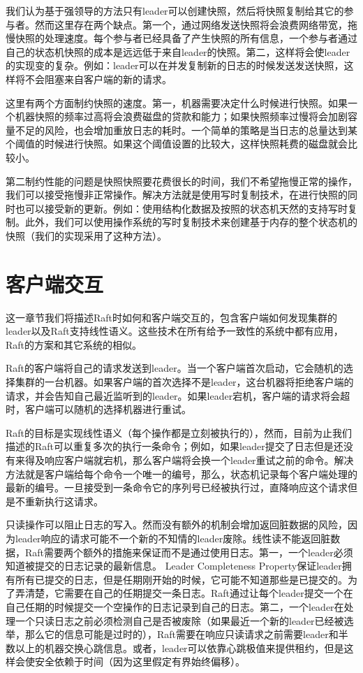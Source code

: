 \documentclass[journal]{IEEEtran}
\begin{document}
我们认为基于强领导的方法只有leader可以创建快照，然后将快照复制给其它的参与者。然而这里存在两个缺点。第一个，通过网络发送快照将会浪费网络带宽，拖慢快照的处理速度。每个参与者已经具备了产生快照的所有信息，一个参与者通过自己的状态机快照的成本是远远低于来自leader的快照。第二，这样将会使leader的实现变的复杂。例如：leader可以在并发复制新的日志的时候发送发送快照，这样将不会阻塞来自客户端的新的请求。

这里有两个方面制约快照的速度。第一，机器需要决定什么时候进行快照。如果一个机器快照的频率过高将会浪费磁盘的贷款和能力；如果快照频率过慢将会加剧容量不足的风险，也会增加重放日志的耗时。一个简单的策略是当日志的总量达到某个阈值的时候进行快照。如果这个阈值设置的比较大，这样快照耗费的磁盘就会比较小。

第二制约性能的问题是快照快照要花费很长的时间，我们不希望拖慢正常的操作，我们可以接受拖慢非正常操作。解决方法就是使用写时复制技术，在进行快照的同时也可以接受新的更新。例如：使用结构化数据及按照的状态机天然的支持写时复制。此外，我们可以使用操作系统的写时复制技术来创建基于内存的整个状态机的快照（我们的实现采用了这种方法）。

\section{客户端交互}

这一章节我们将描述Raft时如何和客户端交互的，包含客户端如何发现集群的leader以及Raft支持线性语义。这些技术在所有给予一致性的系统中都有应用，Raft的方案和其它系统的相似。

Raft的客户端将自己的请求发送到leader。当一个客户端首次启动，它会随机的选择集群的一台机器。如果客户端的首次选择不是leader，这台机器将拒绝客户端的请求，并会告知自己最近监听到的leader。如果leader宕机，客户端的请求将会超时，客户端可以随机的选择机器进行重试。

Raft的目标是实现线性语义（每个操作都是立刻被执行的），然而，目前为止我们描述的Raft可以重复多次的执行一条命令；例如，如果leader提交了日志但是还没有来得及响应客户端就宕机，那么客户端将会换一个leader重试之前的命令。解决方法就是客户端给每个命令一个唯一的编号，那么，状态机记录每个客户端处理的最新的编号。一旦接受到一条命令它的序列号已经被执行过，直降响应这个请求但是不重新执行这请求。

只读操作可以阻止日志的写入。然而没有额外的机制会增加返回脏数据的风险，因为leader响应的请求可能不一个新的不知情的leader废除。线性读不能返回脏数据，Raft需要两个额外的措施来保证而不是通过使用日志。第一，一个leader必须知道被提交的日志记录的最新信息。 Leader Completeness Property保证leader拥有所有已提交的日志，但是任期刚开始的时候，它可能不知道那些是已提交的。为了弄清楚，它需要在自己的任期提交一条日志。Raft通过让每个leader提交一个在自己任期的时候提交一个空操作的日志记录到自己的日志。第二，一个leader在处理一个只读日志之前必须检测自己是否被废除（如果最近一个新的leader已经被选举，那么它的信息可能是过时的），Raft需要在响应只读请求之前需要leader和半数以上的机器交换心跳信息。或者，leader可以依靠心跳极值来提供租约，但是这样会使安全依赖于时间（因为这里假定有界始终偏移）。
\end{document}
